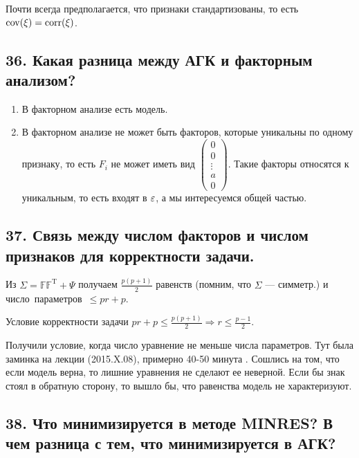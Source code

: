 \begin{note}
  Почти всегда предполагается, что признаки стандартизованы, то есть ${\rm cov}(\xi) = {\rm corr}(\xi)$.
\end{note}

\subsection{ 36. Какая разница между АГК и факторным анализом?}

\begin{enumerate}
\item
В факторном анализе есть модель.

\item
В факторном анализе не может быть факторов, которые уникальны по одному признаку, то есть  $F_i$ не может иметь вид $
\begin{pmatrix}
  0 \\
  0 \\
  \vdots \\
  a \\
  0
\end{pmatrix}$. Такие факторы относятся к уникальным, то есть входят в $\varepsilon$, а мы интересуемся общей частью.
\end{enumerate}


\subsection{ 37. Связь между числом факторов и числом признаков для корректности задачи.}

Из $\Sigma = \mathbb{FF^\mathrm{T}} + \Psi$ получаем $\frac{p(p+1)}{2}$ равенств (помним, что $\Sigma$ --- симметр.) и \\ число~параметров~$\leq pr+p$.

Условие корректности задачи $pr+p \leq \frac{p(p+1)}{2} \Rightarrow r \leq  \frac{p-1}{2}$.

Получили условие, когда число уравнение не меньше числа параметров. Тут была заминка на лекции (2015.X.08), примерно 40-50 минута .  Сошлись на том, что если модель верна, то лишние уравнения не сделают ее неверной. Если бы знак стоял в обратную сторону, то вышло бы, что равенства модель не характеризуют.

\subsection{ 38. Что минимизируется в методе MINRES? В чем разница с тем, что минимизируется в АГК?}


